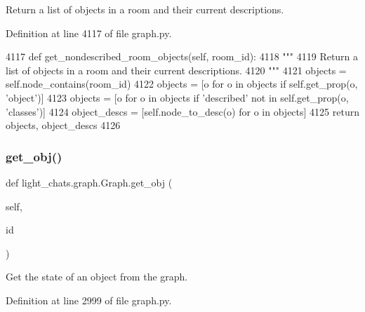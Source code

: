 \begin{DoxyVerb}Return a list of objects in a room and their current descriptions.
\end{DoxyVerb}
 

Definition at line 4117 of file graph.\+py.


\begin{DoxyCode}
4117     \textcolor{keyword}{def }get\_nondescribed\_room\_objects(self, room\_id):
4118         \textcolor{stringliteral}{"""}
4119 \textcolor{stringliteral}{        Return a list of objects in a room and their current descriptions.}
4120 \textcolor{stringliteral}{        """}
4121         objects = self.node\_contains(room\_id)
4122         objects = [o \textcolor{keywordflow}{for} o \textcolor{keywordflow}{in} objects \textcolor{keywordflow}{if} self.get\_prop(o, \textcolor{stringliteral}{'object'})]
4123         objects = [o \textcolor{keywordflow}{for} o \textcolor{keywordflow}{in} objects \textcolor{keywordflow}{if} \textcolor{stringliteral}{'described'} \textcolor{keywordflow}{not} \textcolor{keywordflow}{in} self.get\_prop(o, \textcolor{stringliteral}{'classes'})]
4124         object\_descs = [self.node\_to\_desc(o) \textcolor{keywordflow}{for} o \textcolor{keywordflow}{in} objects]
4125         \textcolor{keywordflow}{return} objects, object\_descs
4126 
\end{DoxyCode}
\mbox{\label{classlight__chats_1_1graph_1_1Graph_ad965678de8b784a4c1506a8814f39767}} 
\subsubsection{\texorpdfstring{get\+\_\+obj()}{get\_obj()}}
{\footnotesize\ttfamily def light\+\_\+chats.\+graph.\+Graph.\+get\+\_\+obj (\begin{DoxyParamCaption}\item[{}]{self,  }\item[{}]{id }\end{DoxyParamCaption})}

\begin{DoxyVerb}Get the state of an object from the graph.
\end{DoxyVerb}
 

Definition at line 2999 of file graph.\+py.


